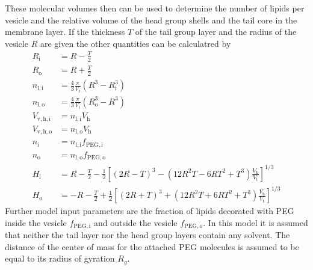 These molecular volumes then can be used to determine the number of lipids per vesicle and the relative volume of the head group shells and the tail core in the membrane layer. If the thickness $T$ of the tail group layer and the radius of the vesicle $R$ are given the other quantities can be calculatred by
\begin{align}
R_\mathrm{i} &= R-\frac T2 \\
R_\mathrm{o} &= R+\frac T2 \\
n_\mathrm{l,i} &= \frac43 \frac{\pi}{V_\mathrm{t}} \left(R^3-R_\mathrm{i}^3\right) \\
n_\mathrm{l,o} &= \frac43 \frac{\pi}{V_\mathrm{t}} \left(R_\mathrm{o}^3-R^3\right) \\
V_\mathrm{v,h,i} &= n_\mathrm{l,i} V_\mathrm{h} \\
V_\mathrm{v,h,o} &= n_\mathrm{l,o} V_\mathrm{h} \\
n_\mathrm{i} &= n_\mathrm{l,i} f_\mathrm{PEG,i} \\
n_\mathrm{o} &= n_\mathrm{l,o} f_\mathrm{PEG,o} \\
H_\mathrm{i} & =  R - \frac T2 - \frac12 \left[\left(2R-T\right)^3 - \left(12R^2T-6RT^2+T^3\right)\frac{V_\mathrm{h}}{V_\mathrm{t}}\right]^{1/3} \\
H_\mathrm{o} & = -R - \frac T2 + \frac12 \left[\left(2R+T\right)^3 + \left(12R^2T+6RT^2+T^3\right)\frac{V_\mathrm{h}}{V_\mathrm{t}}\right]^{1/3}
\end{align}
Further model input parameters are the fraction of lipids decorated with PEG inside the vesicle $f_\mathrm{PEG,i}$ and outside the vesicle  $f_\mathrm{PEG,o}$.
In this model it is assumed that neither the tail layer nor the head group layers contain any solvent. The distance of the center of mass for the attached PEG molecules is assumed to be equal to its radius of gyration $R_g$.
~\\
